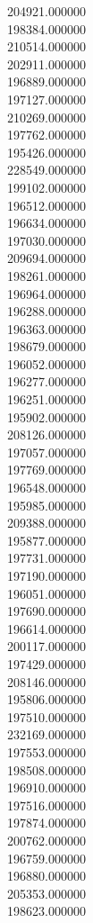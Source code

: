 204921.000000\\
198384.000000\\
210514.000000\\
202911.000000\\
196889.000000\\
197127.000000\\
210269.000000\\
197762.000000\\
195426.000000\\
228549.000000\\
199102.000000\\
196512.000000\\
196634.000000\\
197030.000000\\
209694.000000\\
198261.000000\\
196964.000000\\
196288.000000\\
196363.000000\\
198679.000000\\
196052.000000\\
196277.000000\\
196251.000000\\
195902.000000\\
208126.000000\\
197057.000000\\
197769.000000\\
196548.000000\\
195985.000000\\
209388.000000\\
195877.000000\\
197731.000000\\
197190.000000\\
196051.000000\\
197690.000000\\
196614.000000\\
200117.000000\\
197429.000000\\
208146.000000\\
195806.000000\\
197510.000000\\
232169.000000\\
197553.000000\\
198508.000000\\
196910.000000\\
197516.000000\\
197874.000000\\
200762.000000\\
196759.000000\\
196880.000000\\
205353.000000\\
198623.000000\\
